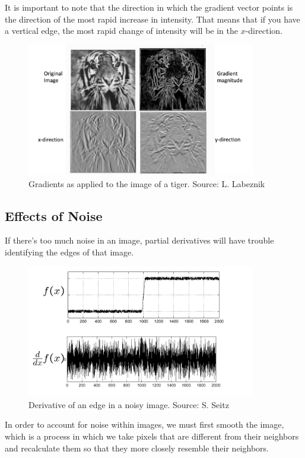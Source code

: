 \documentclass{article}
\begin{document}
It is important to note that the direction in which the gradient vector points is the direction of the most rapid increase in intensity. That means that if you have a vertical edge, the most rapid change of intensity will be in the $x$-direction.

\begin{figure}[H]
\caption{Gradients as applied to the image of a tiger. Source: L. Labeznik}
\centering
\includegraphics[width=10cm]{lazebnik_tiger.png}
\end{figure}


\subsection{Effects of Noise}

If there's too much noise in an image, partial derivatives will have trouble identifying the edges of that image. \newline

\begin{figure}[H]
\caption{Derivative of an edge in a noisy image. Source: S. Seitz}
\centering
\includegraphics[width=10cm]{seitz_noise.png}
\end{figure}

In order to account for noise within images, we must first smooth the image, which is a process in which we take pixels that are different from their neighbors and recalculate them so that they more closely resemble their neighbors. \newline
\end{document}
